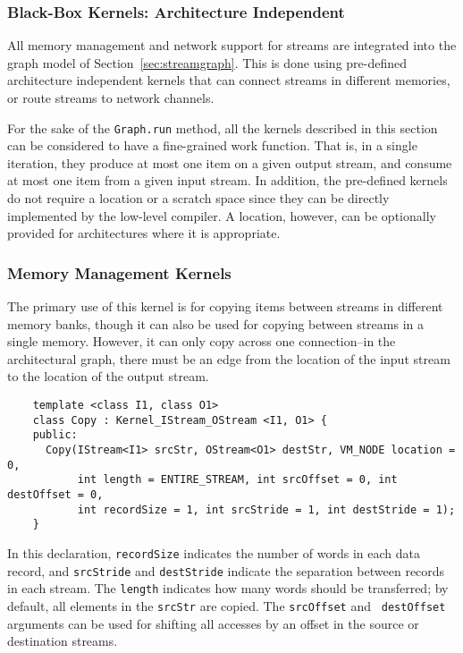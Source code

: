 \subsubsection{Black-Box Kernels:  Architecture Independent}
\label{sec:predef}

All memory management and network support for streams are integrated
into the graph model of Section~\ref{sec:streamgraph}.  This is done
using pre-defined architecture independent kernels that can connect
streams in different memories, or route streams to network channels.

For the sake of the {\tt Graph.run} method, all the kernels described
in this section can be considered to have a fine-grained work
function.  That is, in a single iteration, they produce at most one
item on a given output stream, and consume at most one item from a
given input stream.  In addition, the pre-defined kernels do not
require a location or a scratch space since they can be directly
implemented by the low-level compiler.  A location, however, can be
optionally provided for architectures where it is appropriate.

\subsubsection*{Memory Management Kernels}

 The primary use of this kernel is for copying items
between streams in different memory banks, though it can also be used
for copying between streams in a single memory.  However, it can only
copy across one connection--in the architectural graph, there must be
an edge from the location of the input stream to the location of the
output stream.
{\small
\begin{verbatim}
    template <class I1, class O1> 
    class Copy : Kernel_IStream_OStream <I1, O1> {
    public:
      Copy(IStream<I1> srcStr, OStream<O1> destStr, VM_NODE location = 0, 
           int length = ENTIRE_STREAM, int srcOffset = 0, int destOffset = 0, 
           int recordSize = 1, int srcStride = 1, int destStride = 1);
    }
\end{verbatim}}

In this declaration, {\tt recordSize} indicates the number of words in
each data record, and {\tt srcStride} and {\tt destStride} indicate
the separation between records in each stream.  The {\tt length}
indicates how many words should be transferred; by default, all
elements in the {\tt srcStr} are copied.  The {\tt srcOffset} and {\tt
destOffset} arguments can be used for shifting all accesses by an
offset in the source or destination streams.

